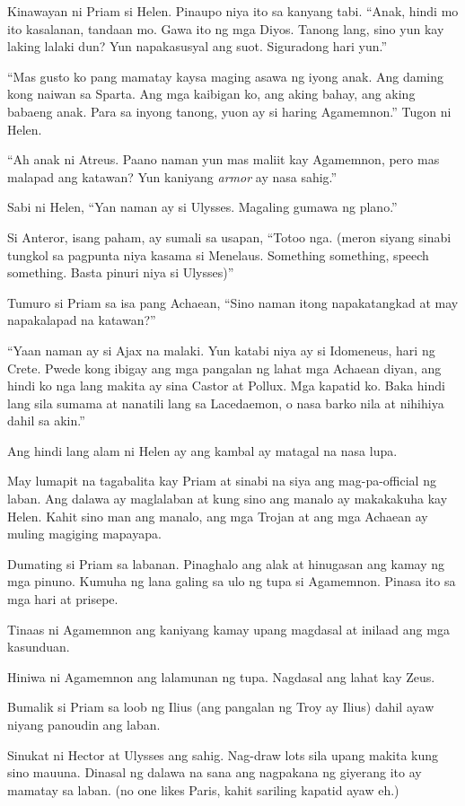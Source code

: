 \documentclass[12pt,letterpaper]{report}
\begin{document}
Kinawayan ni Priam si Helen. Pinaupo niya ito sa kanyang tabi. ``Anak, hindi mo ito kasalanan, tandaan mo. Gawa ito ng mga Diyos. Tanong lang, sino yun kay laking lalaki dun? Yun napakasusyal ang suot. Siguradong hari yun.''

``Mas gusto ko pang mamatay kaysa maging asawa ng iyong anak. Ang daming kong naiwan sa Sparta. Ang mga kaibigan ko, ang aking bahay, ang aking babaeng anak. Para sa inyong tanong, yuon ay si haring Agamemnon.'' Tugon ni Helen.

``Ah anak ni Atreus. Paano naman yun mas maliit kay Agamemnon, pero mas malapad ang katawan? Yun kaniyang \textit{armor} ay nasa sahig.''

Sabi ni Helen, ``Yan naman ay si Ulysses. Magaling gumawa ng plano.''

Si Anteror, isang paham, ay sumali sa usapan, ``Totoo nga. (meron siyang sinabi tungkol sa pagpunta niya kasama si Menelaus. Something something, speech something. Basta pinuri niya si Ulysses)''

Tumuro si Priam sa isa pang Achaean, ``Sino naman itong napakatangkad at may napakalapad na katawan?''

``Yaan naman ay si Ajax na malaki. Yun katabi niya ay si Idomeneus, hari ng Crete. Pwede kong ibigay ang mga pangalan ng lahat mga Achaean diyan, ang hindi ko nga lang makita ay sina Castor at Pollux. Mga kapatid ko. Baka hindi lang sila sumama at nanatili lang sa Lacedaemon, o nasa barko nila at nihihiya dahil sa akin.''

Ang hindi lang alam ni Helen ay ang kambal ay matagal na nasa lupa.

May lumapit na tagabalita kay Priam at sinabi na siya ang mag-pa-official ng laban. Ang dalawa ay maglalaban at kung sino ang manalo ay makakakuha kay Helen. Kahit sino man ang manalo, ang mga Trojan at ang mga Achaean ay muling magiging mapayapa.

Dumating si Priam sa labanan. Pinaghalo ang alak at hinugasan ang kamay ng mga pinuno. Kumuha ng lana galing sa ulo ng tupa si Agamemnon. Pinasa ito sa mga hari at prisepe.

Tinaas ni Agamemnon ang kaniyang kamay upang magdasal at inilaad ang mga kasunduan.

Hiniwa ni Agamemnon ang lalamunan ng tupa. Nagdasal ang lahat kay Zeus.

Bumalik si Priam sa loob ng Ilius (ang pangalan ng Troy ay Ilius) dahil ayaw niyang panoudin ang laban.

Sinukat ni Hector at Ulysses ang sahig. Nag-draw lots sila upang makita kung sino mauuna. Dinasal ng dalawa na sana ang nagpakana ng giyerang ito ay mamatay sa laban. (no one likes Paris, kahit sariling kapatid ayaw eh.)
\end{document}
